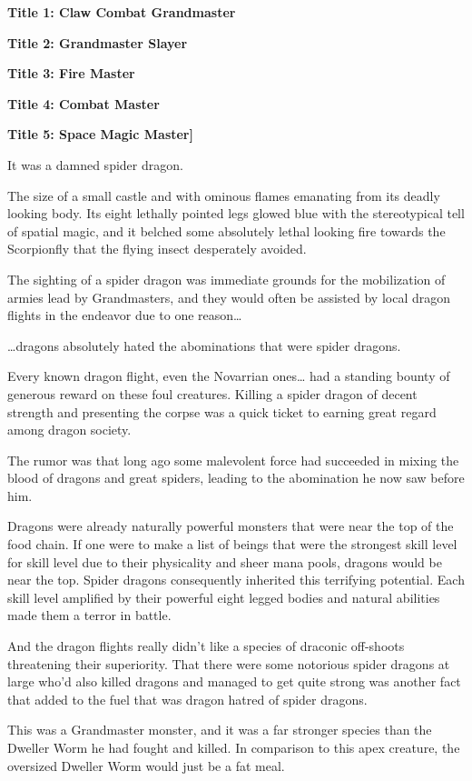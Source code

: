 \documentclass[a4paper,10pt]{book}
\begin{document}
\textbf{Title 1: Claw Combat Grandmaster}\par
\textbf{Title 2: Grandmaster Slayer}\par
\textbf{Title 3: Fire Master}\par
\textbf{Title 4: Combat Master}\par
\textbf{Title 5: Space Magic Master]}\par
It was a damned spider dragon.\par
The size of a small castle and with ominous flames emanating from its deadly looking body. Its eight lethally pointed legs glowed blue with the stereotypical tell of spatial magic, and it belched some absolutely lethal looking fire towards the Scorpionfly that the flying insect desperately avoided.\par
The sighting of a spider dragon was immediate grounds for the mobilization of armies lead by Grandmasters, and they would often be assisted by local dragon flights in the endeavor due to one reason…\par
…dragons absolutely hated the abominations that were spider dragons.\par
Every known dragon flight, even the Novarrian ones… had a standing bounty of generous reward on these foul creatures. Killing a spider dragon of decent strength and presenting the corpse was a quick ticket to earning great regard among dragon society.\par
The rumor was that long ago some malevolent force had succeeded in mixing the blood of dragons and great spiders, leading to the abomination he now saw before him.\par
Dragons were already naturally powerful monsters that were near the top of the food chain. If one were to make a list of beings that were the strongest skill level for skill level due to their physicality and sheer mana pools, dragons would be near the top. Spider dragons consequently inherited this terrifying potential. Each skill level amplified by their powerful eight legged bodies and natural abilities made them a terror in battle.\par
And the dragon flights really didn’t like a species of draconic off-shoots threatening their superiority. That there were some notorious spider dragons at large who’d also killed dragons and managed to get quite strong was another fact that added to the fuel that was dragon hatred of spider dragons.\par
This was a Grandmaster monster, and it was a far stronger species than the Dweller Worm he had fought and killed. In comparison to this apex creature, the oversized Dweller Worm would just be a fat meal.\par
\end{document}
